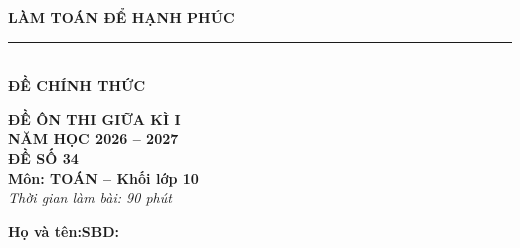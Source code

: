 \documentclass[12pt,a4paper]{article}
\begin{document}
\noindent
\begin{minipage}[c]{0.38\textwidth}
    \centering
    \textbf{LÀM TOÁN ĐỂ HẠNH PHÚC}\\[-2pt]
    \rule{3.2cm}{0.6pt}\\[2pt]
    \textbf{ĐỀ CHÍNH THỨC}
\end{minipage}\hfill
\begin{minipage}[c]{0.35\textwidth}
    \centering
    \textbf{ĐỀ ÔN THI GIỮA KÌ I}\\
    \textbf{NĂM HỌC 2026 -- 2027}\\[2pt]
    \textbf{ĐỀ SỐ 34}\\
    \textbf{Môn: TOÁN -- Khối lớp 10}\\
    \textit{\small Thời gian làm bài: 90 phút}
\end{minipage}

\vspace{0.01cm}
\noindent
\begin{minipage}[b]{0.78\textwidth}
    \textbf{Họ và tên:}\dotfill\textbf{SBD:}\makebox[3.5cm]{\dotfill}
\end{minipage}\hfill
\begin{minipage}[b]{0.20\textwidth}
    \hfill
    \setlength{\fboxrule}{0.8pt}%
\end{minipage}
\vspace{0.01cm}
\end{document}
